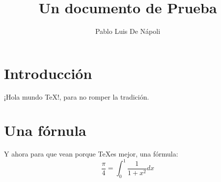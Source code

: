 \documentclass {article}
\begin{document}
 
\title{Un documento de Prueba} 
\author{Pablo Luis De Nápoli} 
\maketitle 
\section{Introducción} 
¡Hola mundo \TeX !, para no romper la tradición. 
\section{Una fórnula} 
Y ahora para que vean porque \TeX es mejor, una fórmula: 
$$ \frac{\pi}{4} = \int_0^1 \frac{1}{1+x^2} dx $$ 
\end{document}
